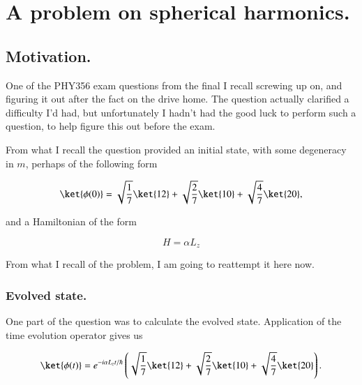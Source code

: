 %
%

\chapter{A problem on spherical harmonics.}
\label{chap:qmIexam2010}
{}
\date{Jan 9, 2011}

\beginArtWithToc

\section{Motivation.}

One of the PHY356 exam questions from the final I recall screwing up on, and figuring it out after the fact on the drive home.  The question actually clarified a difficulty I'd had, but unfortunately I hadn't had the good luck to perform such a question, to help figure this out before the exam.

From what I recall the question provided an initial state, with some degeneracy in $m$, perhaps of the following form

\begin{equation}\label{eqn:qmIexam2010:10}
\ket{\phi(0)} = 
\sqrt{\frac{1}{7}} \ket{ 12 }
+\sqrt{\frac{2}{7}} \ket{ 10 }
+\sqrt{\frac{4}{7}} \ket{ 20 },
\end{equation}

and a Hamiltonian of the form

\begin{equation}\label{eqn:qmIexam2010:20}
H = \alpha L_z
\end{equation}

From what I recall of the problem, I am going to reattempt it here now.

\subsection{Evolved state.}

One part of the question was to calculate the evolved state.  Application of the time evolution operator gives us

\begin{equation}\label{eqn:qmIexam2010:30}
\ket{\phi(t)} = 
e^{-i \alpha L_z t/\hbar} \left(
\sqrt{\frac{1}{7}} \ket{ 12 }
+\sqrt{\frac{2}{7}} \ket{ 10 }
+\sqrt{\frac{4}{7}} \ket{ 20 } \right).
\end{equation}

